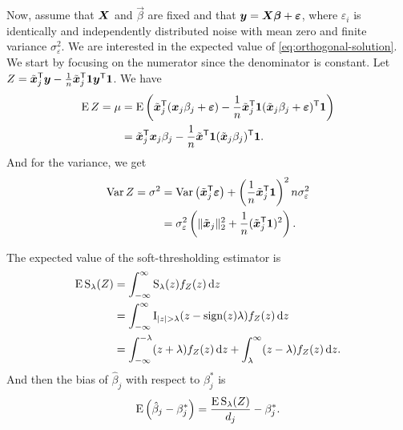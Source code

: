 Now, assume that \(\boldsymbol{X}\) and \(\vec{\beta}\) are fixed and that \(\boldsymbol{y} = \boldsymbol{X}\boldsymbol{\beta} + \boldsymbol{\varepsilon}\), where \(\varepsilon_i\) is identically and independently distributed noise with mean zero and finite variance \(\sigma_\varepsilon^2\). We are interested in the expected value of \eqref{eq:orthogonal-solution}. We start by focusing on the numerator since the denominator is constant. Let \(Z = \tilde{\boldsymbol{x}}_j^{\mathsf{T}} \boldsymbol{y} - \frac{1}{n} \tilde{\boldsymbol{x}}_j^{\mathsf{T}} \boldsymbol{1} \boldsymbol{y}^{\mathsf{T}} \boldsymbol{1}\). We have
\[
  \begin{aligned}
    \operatorname{E} Z = \mu & = \operatorname{E} \left( \tilde{\boldsymbol{x}}_j^{\mathsf{T}} (\boldsymbol{x}_j\beta_j + \boldsymbol{\varepsilon}) - \frac{1}{n} \tilde{\boldsymbol{x}}_j^{\mathsf{T}} \boldsymbol{1} (\tilde{\boldsymbol{x}}_j\beta_j + \boldsymbol{\varepsilon})^{\mathsf{T}} \boldsymbol{1} \right) \\
               & = \tilde{\boldsymbol{x}}_j^{\mathsf{T}}\boldsymbol{x}_j \beta_j - \frac{1}{n} \tilde{\boldsymbol{x}}^{\mathsf{T}} \boldsymbol{1} (\tilde{\boldsymbol{x}}_j\beta_j)^{\mathsf{T}}\boldsymbol{1}.
  \end{aligned}
\]
And for the variance, we get
\[
  \begin{aligned}
    \operatorname{Var} Z = \sigma^2 & = \operatorname{Var}\left(\tilde{\boldsymbol{x}}_j ^{\mathsf{T}} \boldsymbol{\varepsilon}\right) + \left(\frac{1}{n}\tilde{\boldsymbol{x}}_j^{\mathsf{T}} \boldsymbol{1}\right)^2 n \sigma_\varepsilon^2 \\
                      & = \sigma_\varepsilon^2\left( \lVert \tilde{\boldsymbol{x}}_j\rVert_2^2 +\frac{1}{n}(\tilde{\boldsymbol{x}}_j^{\mathsf{T}} \boldsymbol{1})^2\right).
  \end{aligned}
\]

The expected value of the soft-thresholding estimator is
\begin{equation}
  \label{eq:st-expected-value}
  \begin{aligned}
    \operatorname{E} \operatorname{S}_\lambda(Z) & = \int_{-\infty}^\infty \operatorname{S}_\lambda(z) f_Z(z) \mathop{}\!\mathrm{d} z                                                     \\
                      & = \int_{-\infty}^\infty \operatorname{I}_{|z| > \lambda} (z -\operatorname{sign}(z)\lambda) f_Z(z) \mathop{}\!\mathrm{d} z                           \\
                      & = \int_{-\infty}^{-\lambda}(z + \lambda)f_Z(z) \mathop{}\!\mathrm{d} z + \int_{\lambda}^\infty (z - \lambda)f_Z(z) \mathop{}\!\mathrm{d} z.
  \end{aligned}
\end{equation}
And then the bias of \(\hat\beta_j\) with respect to \(\beta_j^*\) is
\begin{equation}
  \label{eq:betahat-bias}
  \operatorname{E} \left( \hat\beta_j - \beta_j^* \right) = \frac{\operatorname{E} \operatorname{S}_\lambda(Z)}{d_j} - \beta^*_j.
\end{equation}

